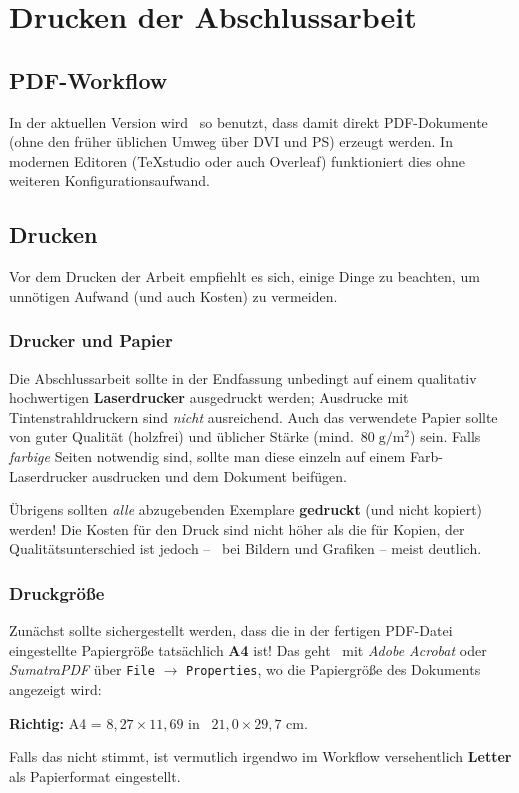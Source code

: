 \chapter{Drucken der Abschlussarbeit}
\label{cha:Drucken}


\section{PDF-Workflow}
\label{sec:pdf}

In der aktuellen Version wird \latex\ so benutzt, dass damit direkt
PDF-Dokumente (ohne den früher üblichen Umweg über DVI und PS) erzeugt werden.
In modernen Editoren (\zB TeXstudio oder auch Overleaf) funktioniert dies ohne
weiteren Konfigurationsaufwand.


\section{Drucken}

Vor dem Drucken der Arbeit empfiehlt es sich, einige Dinge zu beachten, um
unnötigen Aufwand (und auch Kosten) zu vermeiden.

\subsection{Drucker und Papier}

Die Abschlussarbeit sollte in der Endfassung unbedingt auf einem qualitativ
hochwertigen \textbf{Laserdrucker} ausgedruckt werden; Ausdrucke mit
Tintenstrahldruckern sind \emph{nicht} ausreichend. Auch das verwendete
Papier sollte von guter Qualität (holzfrei) und üblicher Stärke (mind.\ $80\;
{\mathrm g} / {\mathrm m}^2$) sein. Falls \emph{farbige} Seiten notwendig
sind, sollte man diese einzeln auf einem Farb-Laserdrucker ausdrucken und dem
Dokument beifügen.

Übrigens sollten \emph{alle} abzugebenden Exemplare \textbf{gedruckt} (und
nicht kopiert) werden! Die Kosten für den Druck sind nicht höher als die für
Kopien, der Qualitätsunterschied ist jedoch -- \va\ bei Bildern und Grafiken
-- meist deutlich.

\subsection{Druckgröße}

Zunächst sollte sichergestellt werden, dass die in der fertigen PDF-Datei
eingestellte Papiergröße tatsächlich \textbf{A4} ist! Das geht \zB\ mit
\emph{Adobe Acrobat} oder \emph{SumatraPDF} über \texttt{File} $\rightarrow$
\texttt{Properties}, wo die Papiergröße des Dokuments angezeigt wird:
\begin{center}
	\textbf{Richtig:} A4 = $8{,}27 \times 11{,}69$ in \bzw\ $21{,}0 \times 29{,}7$ cm.
\end{center}
Falls das nicht stimmt, ist vermutlich irgendwo im Workflow versehentlich
\textbf{Letter} als Papierformat eingestellt.



